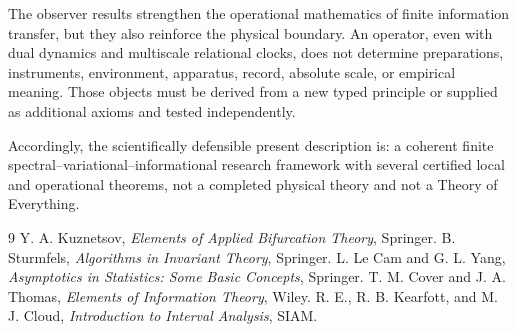 \documentclass[11pt,a4paper]{article}
\begin{document}
The observer results strengthen the operational mathematics of finite information transfer,
but they also reinforce the physical boundary. An operator, even with dual dynamics and
multiscale relational clocks, does not determine preparations, instruments, environment,
apparatus, record, absolute scale, or empirical meaning. Those objects must be derived from
a new typed principle or supplied as additional axioms and tested independently.

Accordingly, the scientifically defensible present description is: a coherent finite
spectral--variational--informational research framework with several certified local and
operational theorems, not a completed physical theory and not a Theory of Everything.

\begin{thebibliography}{9}
 Y. A. Kuznetsov, \emph{Elements of Applied Bifurcation Theory}, Springer.
 B. Sturmfels, \emph{Algorithms in Invariant Theory}, Springer.
 L. Le Cam and G. L. Yang, \emph{Asymptotics in Statistics: Some Basic Concepts}, Springer.
 T. M. Cover and J. A. Thomas, \emph{Elements of Information Theory}, Wiley.
 R. E., R. B. Kearfott, and M. J. Cloud, \emph{Introduction to Interval Analysis}, SIAM.
\end{thebibliography}
\end{document}
